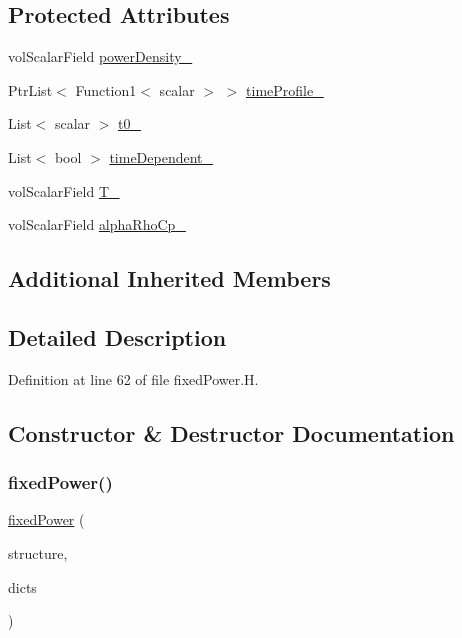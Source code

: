 \subsection*{Protected Attributes}
\begin{DoxyCompactItemize}
\item 
vol\+Scalar\+Field \hyperlink{classFoam_1_1powerModels_1_1fixedPower_afcf025ab8119485c105d92f3ba72a4fd}{power\+Density\+\_\+}
\item 
Ptr\+List$<$ Function1$<$ scalar $>$ $>$ \hyperlink{classFoam_1_1powerModels_1_1fixedPower_af04ec83129f2dbb32ddd3e46e6e6a778}{time\+Profile\+\_\+}
\item 
List$<$ scalar $>$ \hyperlink{classFoam_1_1powerModels_1_1fixedPower_a15480c8346d9202ae61b7a3d920ecfa7}{t0\+\_\+}
\item 
List$<$ bool $>$ \hyperlink{classFoam_1_1powerModels_1_1fixedPower_aa7de418f5709d721311e6d40486f54b2}{time\+Dependent\+\_\+}
\item 
vol\+Scalar\+Field \hyperlink{classFoam_1_1powerModels_1_1fixedPower_a97c6919892227364774ffd51f3fa625b}{T\+\_\+}
\item 
vol\+Scalar\+Field \hyperlink{classFoam_1_1powerModels_1_1fixedPower_ad4f662273df48e473e52b6043705b080}{alpha\+Rho\+Cp\+\_\+}
\end{DoxyCompactItemize}
\subsection*{Additional Inherited Members}


\subsection{Detailed Description}


Definition at line 62 of file fixed\+Power.\+H.



\subsection{Constructor \& Destructor Documentation}
\mbox{\label{classFoam_1_1powerModels_1_1fixedPower_a4869187ce11652768a144d653f05ac8b}} 
\subsubsection{\texorpdfstring{fixed\+Power()}{fixedPower()}}
{\footnotesize\ttfamily \hyperlink{classFoam_1_1powerModels_1_1fixedPower}{fixed\+Power} (\begin{DoxyParamCaption}\item[{\hyperlink{classFoam_1_1structure}{structure} \&}]{structure,  }\item[{const dictionary \&}]{dicts }\end{DoxyParamCaption})}



